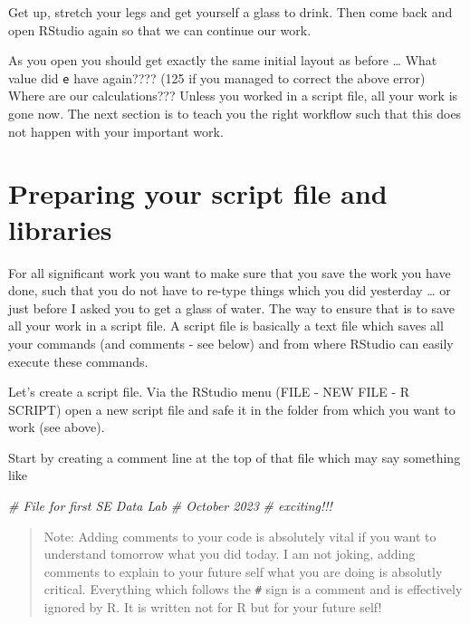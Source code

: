 \documentclass[
]{article}
\newenvironment{Shaded}{\begin{snugshade}}{\end{snugshade}}
\newcommand{\CommentTok}[1]{\textcolor[rgb]{0.56,0.35,0.01}{\textit{#1}}}
\begin{document}
Get up, stretch your legs and get yourself a glass to drink. Then come
back and open RStudio again so that we can continue our work.

As you open you should get exactly the same initial layout as before
\ldots{} What value did \texttt{e} have again???? (125 if you managed to
correct the above error) Where are our calculations??? Unless you worked
in a script file, all your work is gone now. The next section is to
teach you the right workflow such that this does not happen with your
important work.

\hypertarget{preparing-your-script-file-and-libraries}{%
\section{Preparing your script file and
libraries}\label{preparing-your-script-file-and-libraries}}

For all significant work you want to make sure that you save the work
you have done, such that you do not have to re-type things which you did
yesterday \ldots{} or just before I asked you to get a glass of water.
The way to ensure that is to save all your work in a script file. A
script file is basically a text file which saves all your commands (and
comments - see below) and from where RStudio can easily execute these
commands.

Let's create a script file. Via the RStudio menu (FILE - NEW FILE - R
SCRIPT) open a new script file and safe it in the folder from which you
want to work (see above).

Start by creating a comment line at the top of that file which may say
something like

\begin{Shaded}
\begin{Highlighting}[]
\CommentTok{\# File for first SE Data Lab}
\CommentTok{\# October 2023}
\CommentTok{\# exciting!!!}
\end{Highlighting}
\end{Shaded}

\begin{quote}
Note: Adding comments to your code is absolutely vital if you want to
understand tomorrow what you did today. I am not joking, adding comments
to explain to your future self what you are doing is absolutly critical.
Everything which follows the \texttt{\#} sign is a comment and is
effectively ignored by R. It is written not for R but for your future
self!
\end{quote}
\end{document}
